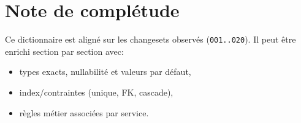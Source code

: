 \section{Note de complétude}
Ce dictionnaire est aligné sur les changesets observés (\texttt{001..020}). Il peut être enrichi section par section avec:
\begin{itemize}
  \item types exacts, nullabilité et valeurs par défaut,
  \item index/contraintes (unique, FK, cascade),
  \item règles métier associées par service.
\end{itemize}

